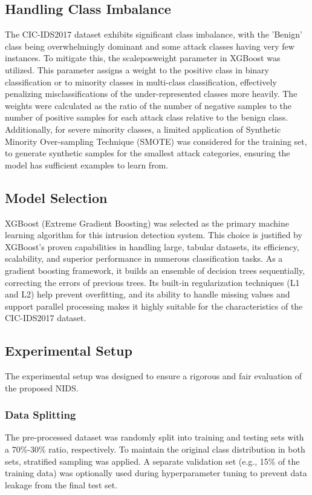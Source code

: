 \subsection{Handling Class Imbalance}
The CIC-IDS2017 dataset exhibits significant class imbalance, with the 'Benign' class being overwhelmingly dominant and some attack classes having very few instances. To mitigate this, the scale\textunderscore pos\textunderscore weight parameter in XGBoost was utilized. This parameter assigns a weight to the positive class in binary classification or to minority classes in multi-class classification, effectively penalizing misclassifications of the under-represented classes more heavily. The weights were calculated as the ratio of the number of negative samples to the number of positive samples for each attack class relative to the benign class. Additionally, for severe minority classes, a limited application of Synthetic Minority Over-sampling Technique (SMOTE) was considered for the training set, to generate synthetic samples for the smallest attack categories, ensuring the model has sufficient examples to learn from.

\subsection{Model Selection}
XGBoost (Extreme Gradient Boosting) was selected as the primary machine learning algorithm for this intrusion detection system. This choice is justified by XGBoost's proven capabilities in handling large, tabular datasets, its efficiency, scalability, and superior performance in numerous classification tasks. As a gradient boosting framework, it builds an ensemble of decision trees sequentially, correcting the errors of previous trees. Its built-in regularization techniques (L1 and L2) help prevent overfitting, and its ability to handle missing values and support parallel processing makes it highly suitable for the characteristics of the CIC-IDS2017 dataset.

\subsection{Experimental Setup}
The experimental setup was designed to ensure a rigorous and fair evaluation of the proposed NIDS.

\subsubsection{Data Splitting}
The pre-processed dataset was randomly split into training and testing sets with a 70\%-30\% ratio, respectively. To maintain the original class distribution in both sets, stratified sampling was applied. A separate validation set (e.g., 15\% of the training data) was optionally used during hyperparameter tuning to prevent data leakage from the final test set.

